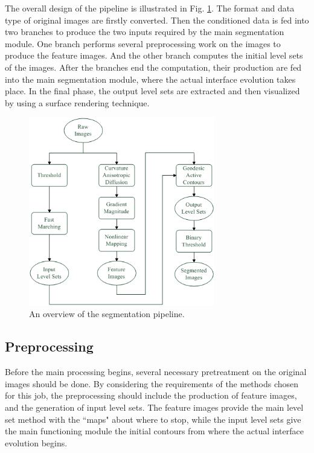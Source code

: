 The overall design of the pipeline is illustrated in Fig. \ref{fig:DataFlow}.
The format and data type of original images are firstly converted.
Then the conditioned data is fed into two branches to produce the two inputs required by the main segmentation module.
One branch performs several preprocessing work on the images to produce the feature images. %
And the other branch computes the initial level sets of the images. %
After the branches end the computation, their production are fed into the main segmentation module, where the actual interface evolution takes place.
In the final phase, the output level sets are extracted and then visualized by using a surface rendering technique.
\begin{figure}[t]
\centering
\includegraphics[width=3.2in]{Figures/chap03/DataFlow.png}
\caption{An overview of the segmentation pipeline.}
\label{fig:DataFlow}
\end{figure}

\subsection{Preprocessing}

Before the main processing begins, several necessary pretreatment on the original images should be done.
By considering the requirements of the methods chosen for this job, the preprocessing should include the production of feature images, and the generation of input level sets.
The feature images provide the main level set method with the ``maps" about where to stop, while the input level sets give the main functioning module the initial contours from where the actual interface evolution begins.

